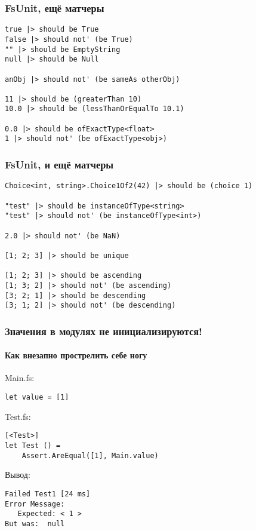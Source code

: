 \documentclass{../../slides-style}
\begin{document}
    \begin{frame}[fragile]
        \frametitle{FsUnit, ещё матчеры}
        \begin{verbatim}
true |> should be True
false |> should not' (be True)
"" |> should be EmptyString
null |> should be Null

anObj |> should not' (be sameAs otherObj)

11 |> should be (greaterThan 10)
10.0 |> should be (lessThanOrEqualTo 10.1)

0.0 |> should be ofExactType<float>
1 |> should not' (be ofExactType<obj>)
        \end{verbatim}
    \end{frame}

    \begin{frame}[fragile]
        \frametitle{FsUnit, и ещё матчеры}
        \begin{verbatim}
Choice<int, string>.Choice1Of2(42) |> should be (choice 1)

"test" |> should be instanceOfType<string>
"test" |> should not' (be instanceOfType<int>)

2.0 |> should not' (be NaN)

[1; 2; 3] |> should be unique

[1; 2; 3] |> should be ascending
[1; 3; 2] |> should not' (be ascending)
[3; 2; 1] |> should be descending
[3; 1; 2] |> should not' (be descending)
        \end{verbatim}
    \end{frame}

    \begin{frame}[fragile]
        \frametitle{Значения в модулях не инициализируются!}
        \framesubtitle{Как внезапно прострелить себе ногу}
        Main.fs:
        \begin{verbatim}
let value = [1]
        \end{verbatim}
        \vspace{5mm}
        Test.fs:
        \begin{verbatim}
[<Test>]
let Test () =
    Assert.AreEqual([1], Main.value)
        \end{verbatim}
        \vspace{5mm}
        Вывод:
        \begin{verbatim}
Failed Test1 [24 ms]
Error Message:
   Expected: < 1 >
But was:  null     
        \end{verbatim}
    \end{frame}
\end{document}
